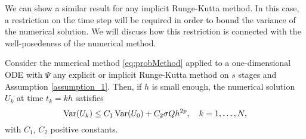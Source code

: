 \noindent We can show a similar result for any implicit Runge-Kutta method. In this case, a restriction on the time step will be required in order to bound the variance of the numerical solution. We will discuss how this restriction is connected with the well-posedeness of the numerical method.
\begin{lemma}\label{lem:varimRK} Consider the numerical method \eqref{eq:probMethod} applied to a one-dimensional ODE with $\Psi$ any explicit or implicit Runge-Kutta method on $s$ stages and Assumption \ref{assumption_1}. Then, if $h$ is small enough, the numerical solution $U_k$ at time $t_k = kh$ satisfies
	\begin{equation}
	\operatorname{Var}(U_k) \leq C_1\operatorname{Var}(U_0) + C_2\sigma Q h^{2p}, \quad k = 1, \ldots, N,
	\end{equation}
	with $C_1$, $C_2$ positive constants.
\end{lemma}
